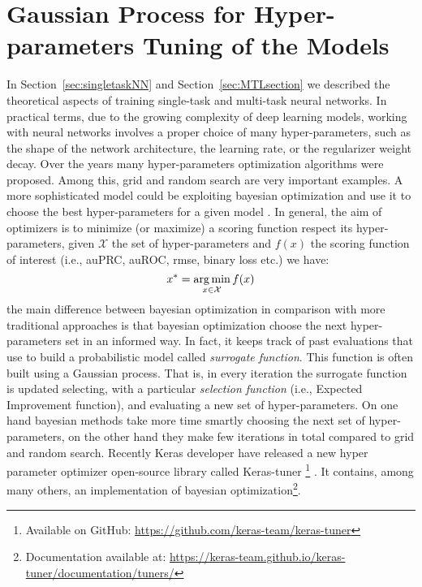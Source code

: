 \section{Gaussian Process for Hyper-parameters Tuning of the Models}
\label{sec:gaussianprocess}
In Section~\ref{sec:singletaskNN} and Section~\ref{sec:MTLsection} we
described the theoretical aspects of training single-task and multi-task neural networks. In practical terms, due to the
growing complexity of deep learning models, working with neural networks
involves a proper choice of many hyper-parameters, such as the shape of
the network architecture, the learning rate, or the regularizer weight
decay. Over the years many hyper-parameters optimization algorithms were
proposed. Among this, grid and random search \cite{BergstraB12} are very important examples. A more sophisticated model could be exploiting bayesian optimization
and use it to choose the best hyper-parameters for a given model
\cite{SnoekGP}. In general, the aim of optimizers is to minimize (or
maximize) a scoring function respect its hyper-parameters, given
$\mathcal{X}$ the set of hyper-parameters and $f(x)$ the scoring function of interest
(i.e., auPRC, auROC, rmse, binary loss etc.) we have: 
\[ 
x^* =  \operatorname*{arg\,min}_{x \in \mathcal{X}} f(x) 
\]
the main difference between bayesian optimization in comparison with more
traditional approaches is that bayesian optimization choose the next
hyper-parameters set in an informed way. In fact, it keeps track of past evaluations
that use to build a probabilistic model called \emph{surrogate function}. This function is often built using a Gaussian process. That is, in every
iteration the surrogate function is updated selecting, with a particular
\emph{selection function} (i.e., Expected Improvement function), and
evaluating a new set of hyper-parameters. On one hand bayesian methods
take more time smartly choosing the next set of hyper-parameters, on the other hand they make few iterations in total compared to grid and random search. 
Recently Keras developer have released a new hyper parameter optimizer
open-source library called Keras-tuner \footnote{Available on GitHub:
\url{https://github.com/keras-team/keras-tuner}}
\cite{omalley2019kerastuner}. It contains, among many others, an
implementation of bayesian optimization\footnote{Documentation available
at: \url{https://keras-team.github.io/keras-tuner/documentation/tuners/}}.

